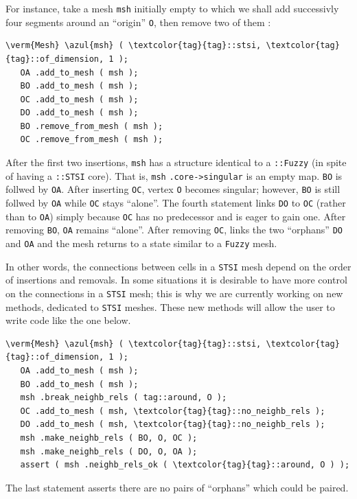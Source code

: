 For instance, take a mesh {\small\tt msh} initially empty to which we shall add successivly
four segments around an ``origin'' {\small\tt O}, then remove two of them :
\begin{Verbatim}[commandchars=\\\{\},formatcom=\small\tt,baselinestretch=0.94]
   \verm{Mesh} \azul{msh} ( \textcolor{tag}{tag}::stsi, \textcolor{tag}{tag}::of_dimension, 1 );
   OA .add_to_mesh ( msh );
   BO .add_to_mesh ( msh );
   OC .add_to_mesh ( msh );
   DO .add_to_mesh ( msh );
   BO .remove_from_mesh ( msh );
   OC .remove_from_mesh ( msh );
\end{Verbatim}
After the first two insertions, {\small\tt msh} has a structure identical to a
{\small\tt{}::Fuzzy} (in spite of having a {\small\tt{}::STSI} core).
That is, {\small\tt msh} {\small\tt .core->singular} is an empty map.
{\small\tt BO} is follwed by {\small\tt OA}.
After inserting {\small\tt OC}, vertex {\small\tt O} becomes singular;
however, {\small\tt BO} is still follwed by {\small\tt OA} while {\small\tt OC} stays ``alone''.
The fourth statement links {\small\tt DO} to {\small\tt OC} (rather than to {\small\tt OA})
simply because {\small\tt OC} has no predecessor and is eager to gain one.
After removing {\small\tt BO}, {\small\tt OA} remains ``alone''.
After removing {\small\tt OC}, {\maniFEM} links the two ``orphans'' {\small\tt DO} and
{\small\tt OA} and the mesh returns to a state similar to a {\small\tt Fuzzy} mesh.

In other words, the connections between cells in a {\small\tt STSI} mesh depend on the order
of insertions and removals.
In some situations it is desirable to have more control on the connections in a {\small\tt STSI} mesh;
this is why we are currently working on new methods, dedicated to {\small\tt STSI} meshes.
These new methods will allow the user to write code like the one below.
\begin{Verbatim}[commandchars=\\\{\},formatcom=\small\tt,baselinestretch=0.94]
   \verm{Mesh} \azul{msh} ( \textcolor{tag}{tag}::stsi, \textcolor{tag}{tag}::of_dimension, 1 );
   OA .add_to_mesh ( msh );
   BO .add_to_mesh ( msh );
   msh .break_neighb_rels ( tag::around, O );
   OC .add_to_mesh ( msh, \textcolor{tag}{tag}::no_neighb_rels );
   DO .add_to_mesh ( msh, \textcolor{tag}{tag}::no_neighb_rels );
   msh .make_neighb_rels ( BO, O, OC );
   msh .make_neighb_rels ( DO, O, OA );
   assert ( msh .neighb_rels_ok ( \textcolor{tag}{tag}::around, O ) );
\end{Verbatim}
The last statement asserts there are no pairs of ``orphans'' which could be paired.


